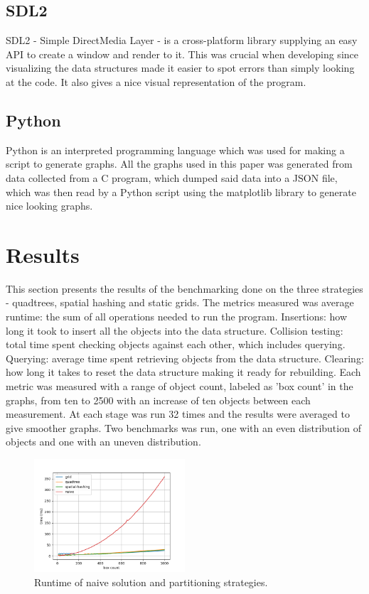 \documentclass[a4paper, 12pt]{article}
\begin{document}
\subsection{SDL2}
SDL2 - Simple DirectMedia Layer - is a cross-platform library supplying an easy
API to create a window and render to it. This was crucial when developing since
visualizing the data structures made it easier to spot errors than simply
looking at the code. It also gives a nice visual representation of the program.

\subsection{Python}
Python is an interpreted programming language which was used for making a script
to generate graphs. All the graphs used in this paper was generated from data
collected from a C program, which dumped said data into a JSON file, which was
then read by a Python script using the matplotlib library to generate nice
looking graphs.

\newpage

\section{Results}
This section presents the results of the benchmarking done on the three
strategies - quadtrees, spatial hashing and static grids. The metrics measured
was average runtime: the sum of all operations needed to run the program.
Insertions: how long it took to insert all the objects into the data structure.
Collision testing: total time spent checking objects against each other, which
includes querying. Querying: average time spent retrieving objects from the data
structure. Clearing: how long it takes to reset the data structure making it
ready for rebuilding. Each metric was measured with a range of object count,
labeled as 'box count' in the graphs, from ten to 2500 with an increase of ten
objects between each measurement. At each stage was run 32 times and the results
were averaged to give smoother graphs. Two benchmarks was run, one with an even
distribution of objects and one with an uneven distribution.

\begin{figure}[h]
    \centering
    \includegraphics[width=0.5\textwidth]{even-naive.png}
    \caption{Runtime of naive solution and partitioning strategies.}
    \label{fig:naive}
\end{figure}
\end{document}
